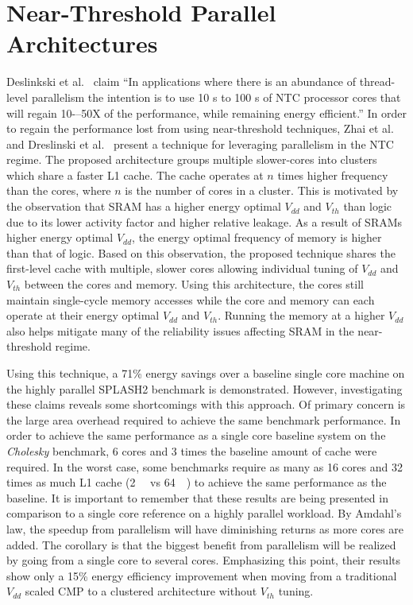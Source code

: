 \section{Near-Threshold Parallel Architectures} \label{sec:clustering}

Deslinkski et al.~\cite{dreslinski2010near} claim ``In applications where there
is an abundance of thread-level parallelism the intention is to use 10 s to 100
s of NTC processor cores that will regain 10-–50X of the performance, while
remaining energy efficient.'' In order to regain the performance lost from using
near-threshold techniques, Zhai et al.~\cite{Zhai:2007kn} and Dreslinski et
al.~\cite{Dreslinski:2007id} present a technique for leveraging parallelism in
the NTC regime. The proposed architecture groups multiple slower-cores into
clusters which share a faster L1 cache. The cache operates at $n$ times higher
frequency than the cores, where $n$ is the number of cores in a cluster. This is
motivated by the observation that SRAM has a higher energy optimal $V_{dd}$ and
$V_{th}$ than logic due to its lower activity factor and higher relative
leakage.  As a result of SRAMs higher energy optimal $V_{dd}$, the energy
optimal frequency of memory is higher than that of logic.  Based on this
observation, the proposed technique shares the first-level cache with multiple,
slower cores allowing individual tuning of $V_{dd}$ and $V_{th}$ between the
cores and memory. Using this architecture, the cores still maintain single-cycle
memory accesses while the core and memory can each operate at their energy
optimal $V_{dd}$ and $V_{th}$. Running the memory at a higher $V_{dd}$ also
helps
mitigate many of the reliability issues affecting SRAM in the near-threshold
regime.

Using this technique, a 71\% energy savings over a baseline single core machine
on the highly parallel SPLASH2 benchmark is demonstrated. However,
investigating these claims reveals some shortcomings with this approach.
Of primary concern is the large area overhead required to achieve the same
benchmark performance. In order to achieve the same performance as a single core
baseline system on the \emph{Cholesky} benchmark, 6 cores and 3 times the
baseline amount of cache were required.  In the worst case, some benchmarks
require as many as 16 cores and 32 times as much L1 cache (\SI{2}{\mega\byte} vs
\SI{64}{\kilo\byte}) to achieve the same performance as the baseline.  It is
important to remember that these results are being presented in comparison to a
single core reference on a highly parallel workload. By Amdahl's law, the
speedup from parallelism will have diminishing returns as more cores are added.
The corollary is that the biggest benefit from parallelism will be realized by
going from a single core to several cores. Emphasizing this point, their
results show only a 15\% energy efficiency improvement when moving from a
traditional $V_{dd}$ scaled CMP to a clustered architecture without $V_{th}$
tuning.

